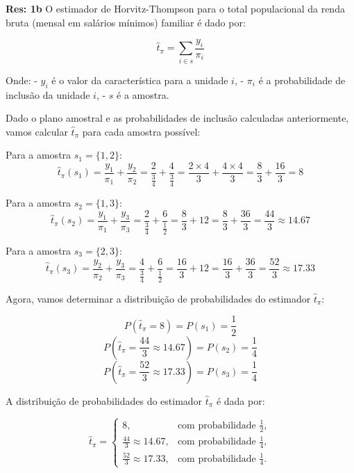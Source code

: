 \documentclass[a4paper,12pt,oneside,twocolumn]{Config/milktest}
\begin{document}
\medskip
{\scriptsize

\textbf{Res:  1b} O estimador de Horvitz-Thompson para o total populacional da renda bruta (mensal em salários mínimos) familiar é dado por:

\[
\hat{t}_\pi = \sum_{i \in s} \frac{y_i}{\pi_i}
\]

Onde:
- \(y_i\) é o valor da característica para a unidade \(i\),
- \(\pi_i\) é a probabilidade de inclusão da unidade \(i\),
- \(s\) é a amostra.

Dado o plano amostral e as probabilidades de inclusão calculadas anteriormente, vamos calcular \(\hat{t}_\pi\) para cada amostra possível:

Para a amostra \(s_1 = \{1, 2\}\):
\[
\hat{t}_\pi(s_1) = \frac{y_1}{\pi_1} + \frac{y_2}{\pi_2} = \frac{2}{\frac{3}{4}} + \frac{4}{\frac{3}{4}} = \frac{2 \times 4}{3} + \frac{4 \times 4}{3} = \frac{8}{3} + \frac{16}{3} = 8
\]

Para a amostra \(s_2 = \{1, 3\}\):
\[
\hat{t}_\pi(s_2) = \frac{y_1}{\pi_1} + \frac{y_3}{\pi_3} = \frac{2}{\frac{3}{4}} + \frac{6}{\frac{1}{2}} = \frac{8}{3} + 12 = \frac{8}{3} + \frac{36}{3} = \frac{44}{3} \approx 14.67
\]

Para a amostra \(s_3 = \{2, 3\}\):
\[
\hat{t}_\pi(s_3) = \frac{y_2}{\pi_2} + \frac{y_3}{\pi_3} = \frac{4}{\frac{3}{4}} + \frac{6}{\frac{1}{2}} = \frac{16}{3} + 12 = \frac{16}{3} + \frac{36}{3} = \frac{52}{3} \approx 17.33
\]

Agora, vamos determinar a distribuição de probabilidades do estimador \(\hat{t}_\pi\):

\[
P\left(\hat{t}_\pi = 8\right) = P(s_1) = \frac{1}{2}
\]
\[
P\left(\hat{t}_\pi = \frac{44}{3} \approx 14.67\right) = P(s_2) = \frac{1}{4}
\]
\[
P\left(\hat{t}_\pi = \frac{52}{3} \approx 17.33\right) = P(s_3) = \frac{1}{4}
\]

A distribuição de probabilidades do estimador \(\hat{t}_\pi\) é dada por:

\[
\hat{t}_\pi =
\begin{cases}
8, & \text{com probabilidade } \frac{1}{2}, \\
\frac{44}{3} \approx 14.67, & \text{com probabilidade } \frac{1}{4}, \\
\frac{52}{3} \approx 17.33, & \text{com probabilidade } \frac{1}{4}.
\end{cases}
\]
}
\end{document}
